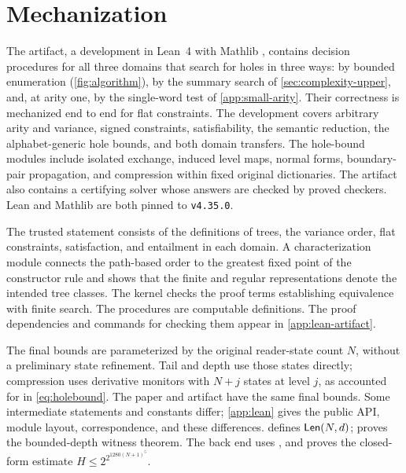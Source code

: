 \section{Mechanization}
\label{sec:mechanization}

The artifact, a development in Lean~4 \citep{MouraUllrich21} with Mathlib
\citep{Mathlib20}, contains decision procedures for all three domains that
search for holes in three ways: by bounded enumeration
(\cref{fig:algorithm}), by the summary search of
\cref{sec:complexity-upper}, and, at arity one, by the single-word test of
\cref{app:small-arity}. Their correctness is mechanized end to end for flat
constraints. The development covers arbitrary arity and variance, signed
constraints, satisfiability, the semantic reduction, the alphabet-generic
hole bounds, and both domain transfers. The hole-bound modules include
isolated exchange, induced level maps, normal forms, boundary-pair
propagation, and compression within fixed original dictionaries. The
artifact also contains a certifying solver whose answers are checked by
proved checkers. Lean and Mathlib are both pinned to \texttt{v4.35.0}.

The trusted statement consists of the definitions of trees, the variance
order, flat constraints, satisfaction, and entailment in each domain.
A characterization module connects the path-based order to the greatest
fixed point of the constructor rule and shows that the finite and regular
representations denote the intended tree classes. The kernel checks the
proof terms establishing equivalence with finite search. The procedures
are computable definitions. The proof dependencies and commands for
checking them appear in \cref{app:lean-artifact}.

The final bounds are parameterized by the original reader-state count $N$,
without a preliminary state refinement. Tail and depth use those states
directly; compression uses derivative monitors with $N+j$ states at
level $j$, as accounted for in \eqref{eq:holebound}. The paper and artifact
have the same final bounds. Some intermediate statements and constants
differ; \cref{app:lean} gives the public API, module layout, correspondence,
and these differences.  defines
$\mathsf{Len}(N,d)$;  proves the
bounded-depth witness theorem. The back end uses
, and
 proves the closed-form estimate
$H\le2^{2^{1280(N+1)^5}}$.

